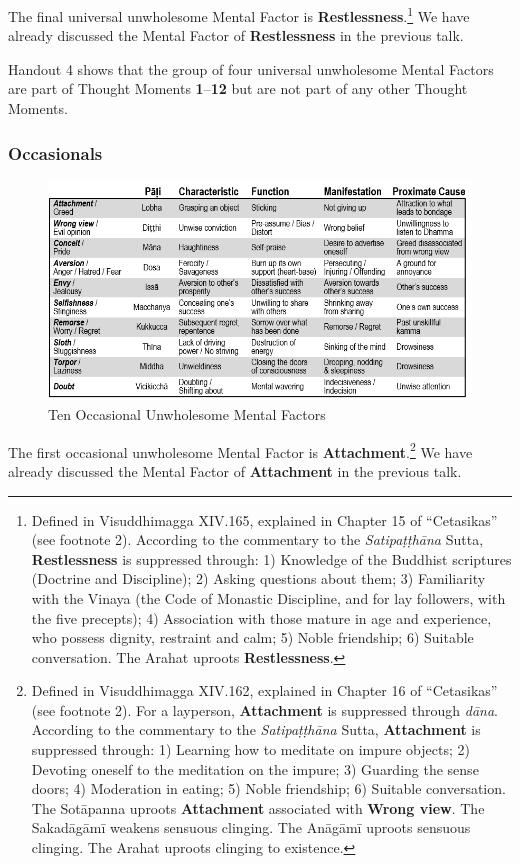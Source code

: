 The final universal unwholesome Mental Factor is \textbf{Restlessness}.\footnote{Defined in Visuddhimagga XIV.165, explained in Chapter 15 of “Cetasikas” (see footnote 2). According to the commentary to the \textit{Satipaṭṭhāna} Sutta, \textbf{Restlessness} is suppressed through: 1) Knowledge of the Buddhist scriptures (Doctrine and Discipline); 2) Asking questions about them; 3) Familiarity with the Vinaya (the Code of Monastic Discipline, and for lay followers, with the five precepts); 4) Association with those mature in age and experience, who possess dignity, restraint and calm; 5) Noble friendship; 6) Suitable conversation. The Arahat uproots \textbf{Restlessness}.} We have already discussed the Mental Factor of \textbf{Restlessness} in the previous talk.

Handout 4 shows that the group of four universal unwholesome Mental Factors are part of Thought Moments \textbf{1}--\textbf{12} but are not part of any other Thought Moments.

\subsubsection*{Occasionals}

\begin{figure}[h]
\centering
\includegraphics[width=0.8\linewidth]{./Diagrams/O-U}
\caption{Ten Occasional Unwholesome Mental Factors}
\label{fig:O-U}
\end{figure}

The first occasional unwholesome Mental Factor is \textbf{Attachment}.\footnote{Defined in Visuddhimagga XIV.162, explained in Chapter 16 of “Cetasikas” (see footnote 2). For a layperson, \textbf{Attachment} is suppressed through \textit{dāna}. According to the commentary to the \textit{Satipaṭṭhāna} Sutta, \textbf{Attachment} is suppressed through: 1) Learning how to meditate on impure objects; 2) Devoting oneself to the meditation on the impure; 3) Guarding the sense doors; 4) Moderation in eating; 5) Noble friendship; 6) Suitable conversation. The Sotāpanna uproots \textbf{Attachment} associated with \textbf{Wrong view}. The Sakadāgāmī weakens sensuous clinging. The Anāgāmī uproots sensuous clinging. The Arahat uproots clinging to existence.
} We have already discussed the Mental Factor of \textbf{Attachment} in the previous talk.

